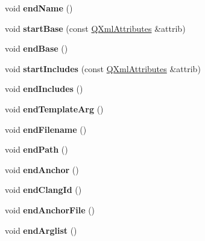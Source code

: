 \begin{DoxyCompactItemize}
void {\bfseries end\+Name} ()
\item 
\mbox{\label{class_tag_file_parser_ac9fab44512abd410a1e351cc41e9abd7}} 
void {\bfseries start\+Base} (const \mbox{\hyperlink{class_q_xml_attributes}{Q\+Xml\+Attributes}} \&attrib)
\item 
\mbox{\label{class_tag_file_parser_a77b9865b6dbdc647b825c2ac5440648a}} 
void {\bfseries end\+Base} ()
\item 
\mbox{\label{class_tag_file_parser_a0703a045114c51e2c8a265a4f7b59d50}} 
void {\bfseries start\+Includes} (const \mbox{\hyperlink{class_q_xml_attributes}{Q\+Xml\+Attributes}} \&attrib)
\item 
\mbox{\label{class_tag_file_parser_a4a6f3a01d14a9233322d1281ac568e2b}} 
void {\bfseries end\+Includes} ()
\item 
\mbox{\label{class_tag_file_parser_a69ef902b3409f6cb1c09dd23ea836838}} 
void {\bfseries end\+Template\+Arg} ()
\item 
\mbox{\label{class_tag_file_parser_aeb11d87bb2fd76859a6d1390ec5565c8}} 
void {\bfseries end\+Filename} ()
\item 
\mbox{\label{class_tag_file_parser_ac9a90fee9e64016f476fd4f71ae5fc3c}} 
void {\bfseries end\+Path} ()
\item 
\mbox{\label{class_tag_file_parser_a7f1486b9a2a926ecc5dce03420148f91}} 
void {\bfseries end\+Anchor} ()
\item 
\mbox{\label{class_tag_file_parser_a6a2bcfbad3ba6c6eda830ddec5e2e9f8}} 
void {\bfseries end\+Clang\+Id} ()
\item 
\mbox{\label{class_tag_file_parser_a4fd27631371b12c34da983007311f032}} 
void {\bfseries end\+Anchor\+File} ()
\item 
\mbox{\label{class_tag_file_parser_a683c1db16fb9938e213516a668d387b2}} 
void {\bfseries end\+Arglist} ()

\end{DoxyCompactItemize}
